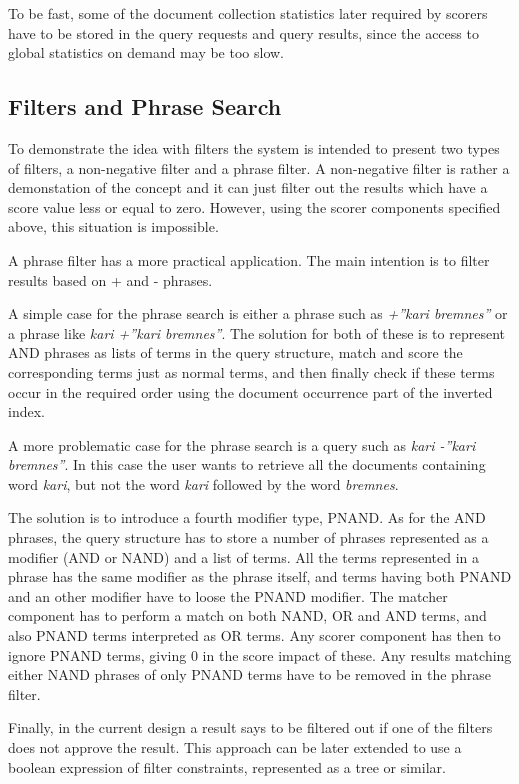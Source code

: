 To be fast, some of the document collection statistics later required by scorers have to be stored in the query requests and query results, since the access to global statistics on demand may be too slow. 

\subsection{Filters and Phrase Search}
To demonstrate the idea with filters the system is intended to present two types of filters, a non-negative filter and a phrase filter. A non-negative filter is rather a demonstation of the concept and it can just filter out the results which have a score value less or equal to zero. However, using the scorer components specified above, this situation is impossible.

A phrase filter has a more practical application. The main intention is to filter results based on + and - phrases.

A simple case for the phrase search is either a phrase such as {\it +''kari bremnes''} or a phrase like {\it kari +''kari bremnes''}. The solution for both of these is to represent AND phrases as lists of terms in the query structure, match and score the corresponding terms just as normal terms, and then finally check if these terms occur in the required order using the document occurrence part of the inverted index.

A more problematic case for the phrase search is a query such as {\it kari -''kari bremnes''}. In this case the user wants to retrieve all the documents containing word {\it kari}, but not the word {\it kari} followed by the word {\it bremnes}.

The solution is to introduce a fourth modifier type, PNAND. As for the AND phrases, the query structure has to store a number of phrases represented as a modifier (AND or NAND) and a list of terms. All the terms represented in a phrase has the same modifier as the phrase itself, and terms having both PNAND and an other modifier have to loose the PNAND modifier. The matcher component has to perform a match on both NAND, OR and AND terms, and also PNAND terms interpreted as OR terms. Any scorer component has then to ignore PNAND terms, giving 0 in the score impact of these. Any results matching either NAND phrases of only PNAND terms have to be removed in the phrase filter.

Finally, in the current design a result says to be filtered out if one of the filters does not approve the result. This approach can be later extended to use a boolean expression of filter constraints, represented as a tree or similar.

